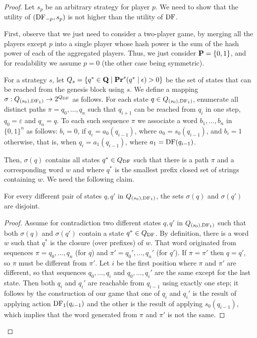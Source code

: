 \begin{proof}
Let $s_p$ be an arbitrary strategy for player $p$. We need to show that the utility of $(\text{\rm DF}_{-p},s_p)$ is not higher than the utility of $\text{\rm DF}$. 

First, observe that we just need to consider a two-player game, by merging all the players except $p$ into a single player whose hash power is the sum of the hash power 
of each of the aggregated players. Thus, we just consider $\mathbf{P} = \{0,1\}$, and for readability we assume $p = 0$ (the other case being symmetric). 

For a strategy $s$, let $Q_s = \{q^* \in \mathbf{Q} \mid \mathbf{Pr}^s(q^* \mid \epsilon) > 0\}$ be the set of states that can be reached from the genesis block using $s$. 
We define a mapping $\sigma: Q_{(s_0),\text{\rm DF}_1)} \rightarrow 2^{Q_{\text{\rm DF}}}$ as follows. 
For each state $q \in Q_{(s_0),\text{\rm DF}_1)}$, enumerate all distinct paths $\pi = q_0,\dots,q_n$ such that $q_{i+1}$ can be reached from 
$q_i$ in one step, $q_0 = \varepsilon$ and $q_n = q$. To each such sequence $\pi$ we associate a word $b_1,\dots,b_n$ in $\{0,1\}^n$ as follows: 
$b_i = 0$, if $q_{i} = a_0(q_{i-1})$, where $a_0 = s_0(q_{i-1})$, and $b_i = 1$ otherwise, that is, when  $q_{i} = a_1(q_{i-1})$, where $a_1 = \text{\rm DF}(q_{i-1})$. 

Then, $\sigma(q)$ contains all states $q^* \in Q_{\text{\rm DF}}$ such that there is a path $\pi$ and a corresponding word $w$ and where 
$q^*$ is the smallest prefix closed set of strings containing $w$. We need the following claim. 

\begin{myclaim}
For every different pair of states $q,q'$ in $Q_{(s_0),\text{\rm DF}_1)}$, the sets $\sigma(q)$ and $\sigma(q')$ are disjoint. 
\end{myclaim}

\begin{proof}
Assume for contradiction two different  states $q,q'$ in $Q_{(s_0),\text{\rm DF}_1)}$ such that both $\sigma(q)$ and $\sigma(q')$ contain a state $q^* \in Q_{\text{\rm DF}}$. By definition, there is a word 
$w$ such that $q^*$ is the closure (over prefixes) of $w$. That word originated from sequences $\pi = q_0,\dots,q_n$ (for $q$) and $\pi' = q_0',\dots,q_n'$ (for $q'$). If 
$\pi = \pi'$ then $q = q'$, so $\pi$ must be different from $\pi'$. Let $i$ be the first position where $\pi$ and $\pi'$ are different, so that 
sequences $q_0,\dots,q_i$ and $q_0,\dots,q_i'$ are the same except for the last state. Then both $q_i$ and $q_i'$ are reachable from $q_{i-1}$ using exactly one step; it follows 
by the construction of our game that one of $q_i$ and $q_i'$ is the result of applying action $\text{\rm DF}_1(q_{i-1})$ and the other is the result of applying $s_0(q_{i-1})$, which implies that 
the word generated from $\pi$ and $\pi'$ is not the same. 
\end{proof}


\end{proof}
